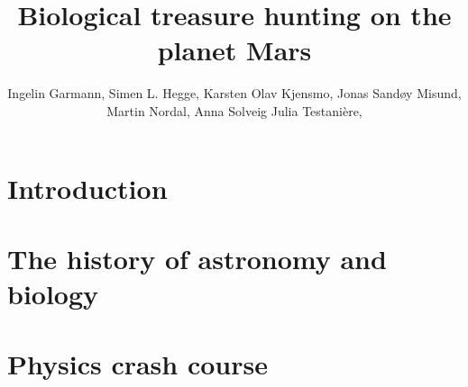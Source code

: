 \documentclass[DIV=calc, paper=a4, fontsize=12pt]{scrartcl}	 %
\title{Biological treasure hunting on the planet Mars} %
\author{Ingelin Garmann, Simen L. Hegge, Karsten Olav Kjensmo, Jonas Sandøy Misund, Martin Nordal, Anna Solveig Julia Testani\`{e}re, } %
\date{} %
\newcommand{\initial}[1]{ %
\lettrine[lines=2,lhang=0.3,nindent=0em]{
\color{DarkRed}
{\textsf{#1}}}{}}
\begin{document}
\maketitle %

\thispagestyle{fancy} %





\section*{Introduction}

\begin{multicols}{2}



\end{multicols}


\pagebreak

\section*{The history of astronomy and biology}

\begin{multicols}{2}





\end{multicols}

\section*{Physics crash course}

\begin{multicols}{2}







\end{multicols}
\end{document}
